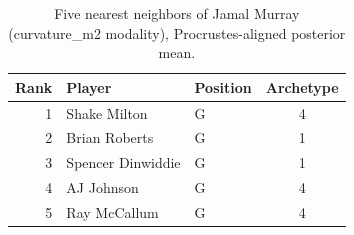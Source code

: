 \begin{table}[htbp]
  \centering\small
  \begin{tabular}{rllc}
    \toprule
    Rank & Player & Position & Archetype \\
    \midrule
    1 & Shake Milton & G & 4 \\
    2 & Brian Roberts & G & 1 \\
    3 & Spencer Dinwiddie & G & 1 \\
    4 & AJ Johnson & G & 4 \\
    5 & Ray McCallum & G & 4 \\
    \bottomrule
  \end{tabular}
  \caption{Five nearest neighbors of Jamal Murray (curvature_m2 modality), Procrustes-aligned posterior mean.}
  \label{tab:Jamal_Murray_neighbors_curvature_m2}
\end{table}

